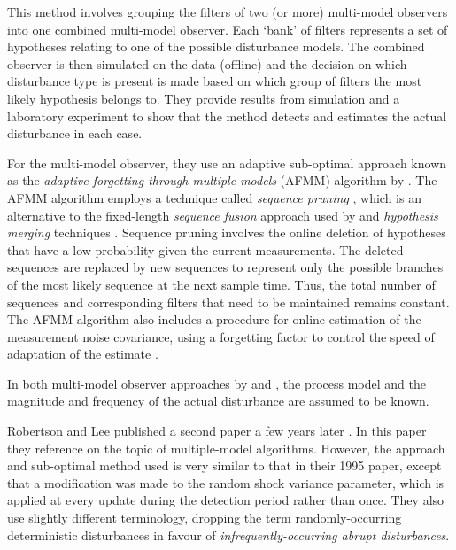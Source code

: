 This method involves grouping the filters of two (or more) multi-model observers into one combined multi-model observer. Each `bank' of filters represents a set of hypotheses relating to one of the possible disturbance models. The combined observer is then simulated on the data (offline) and the decision on which disturbance type is present is made based on which group of filters the most likely hypothesis belongs to. They provide results from simulation and a laboratory experiment to show that the method detects and estimates the actual disturbance in each case.

For the multi-model observer, they use an adaptive sub-optimal approach known as the \textit{adaptive forgetting through multiple models} (AFMM) algorithm by \cite{andersson_adaptive_1985}. The AFMM algorithm employs a technique called \textit{sequence pruning} \citep{tugnait_detection_1982}, which is an alternative to the fixed-length \textit{sequence fusion} approach used by \cite{robertson_detection_1995} and \textit{hypothesis merging} techniques \citep{blom_interacting_1988}. Sequence pruning involves the online deletion of hypotheses that have a low probability given the current measurements. The deleted sequences are replaced by new sequences to represent only the possible branches of the most likely sequence at the next sample time. Thus, the total number of sequences and corresponding filters that need to be maintained remains constant. The AFMM algorithm also includes a procedure for online estimation of the measurement noise covariance, using a forgetting factor to control the speed of adaptation of the estimate \citep{andersson_adaptive_1985}.

In both multi-model observer approaches by \cite{eriksson_classification_1996} and \cite{robertson_detection_1995}, the process model and the magnitude and frequency of the actual disturbance are assumed to be known.

Robertson and Lee published a second paper a few years later \citep{robertson_method_1998}. In this paper they reference \cite{andersson_adaptive_1985} on the topic of multiple-model algorithms.  However, the approach and sub-optimal method used is very similar to that in their 1995 paper, except that a modification was made to the random shock variance parameter, which is applied at every update during the detection period rather than once. They also use slightly different terminology, dropping the term randomly-occurring deterministic disturbances in favour of \textit{infrequently-occurring abrupt disturbances}.

